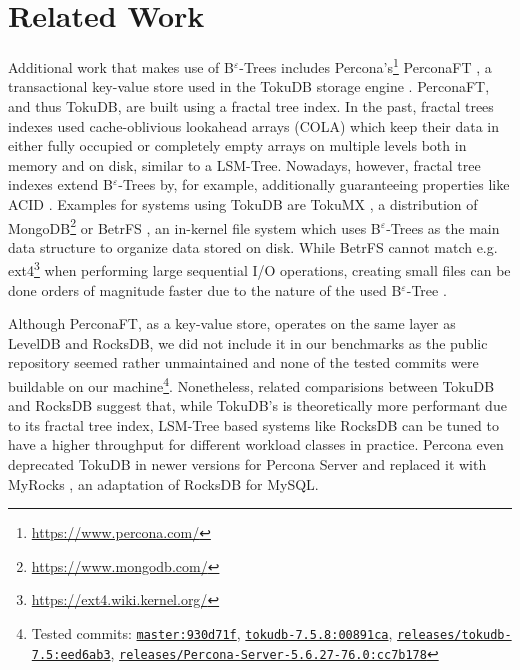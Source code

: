 
\chapter{Related Work}\label{chapter:related_work}

Additional work that makes use of B$^\varepsilon$-Trees includes Percona's\footnote{\href{https://www.percona.com/}{https://www.percona.com/}} PerconaFT \cite{perconaft}, a transactional key-value store used in the TokuDB storage engine \cite{percona_tokudb}. PerconaFT, and thus TokuDB, are built using a fractal tree index. In the past, fractal trees indexes used cache-oblivious lookahead arrays (COLA) \cite{b_epsilon_vs_cola} which keep their data in either fully occupied or completely empty arrays on multiple levels both in memory and on disk, similar to a LSM-Tree. Nowadays, however, fractal tree indexes extend B$^\varepsilon$-Trees by, for example, additionally guaranteeing properties like ACID \cite{percona_server}.\newline
Examples for systems using TokuDB are TokuMX \cite{percona_tokumx}, a distribution of MongoDB\footnote{\href{https://www.mongodb.com/}{https://www.mongodb.com/}} or BetrFS \cite{betrfs}, an in-kernel file system which uses B$^\varepsilon$-Trees as the main data structure to organize data stored on disk. While BetrFS cannot match e.g. ext4\footnote{\href{https://ext4.wiki.kernel.org/}{https://ext4.wiki.kernel.org/}} when performing large sequential I/O operations, creating small files can be done orders of magnitude faster due to the nature of the used B$^\varepsilon$-Tree \cite{betrfs}.

Although PerconaFT, as a key-value store, operates on the same layer as LevelDB and RocksDB, we did not include it in our benchmarks as the public repository seemed rather unmaintained and none of the tested commits were buildable on our machine\footnote{
Tested commits:\newline
\href{https://github.com/percona/PerconaFT/commit/930d71fcd0ec49ab21c1e83d43a778532017e5cd}{\texttt{master:930d71f}},\newline
\href{https://github.com/percona/PerconaFT/commit/00891caaa3d73a59dc297f16719fda7adf1ba95b}{\texttt{tokudb-7.5.8:00891ca}},\newline
\href{https://github.com/percona/PerconaFT/commit/eed6ab3f956ac1189af00da38601961792b87a9a}{\texttt{releases/tokudb-7.5:eed6ab3}},\newline
\href{https://github.com/percona/PerconaFT/commit/cc7b1780eefa79936fd8a1d459626dddec457545}{\texttt{releases/Percona-Server-5.6.27-76.0:cc7b178}}
}.
Nonetheless, related comparisions between TokuDB and RocksDB \cite{tokudb_vs_rocksdb,tokudb_vs_rocksdb_2} suggest that, while TokuDB's is theoretically more performant due to its fractal tree index, LSM-Tree based systems like RocksDB can be tuned to have a higher throughput for different workload classes in practice. Percona even deprecated TokuDB in newer versions for Percona Server \cite{percona_tokudb_deprecated} and replaced it with MyRocks \cite{myrocks}, an adaptation of RocksDB for MySQL.